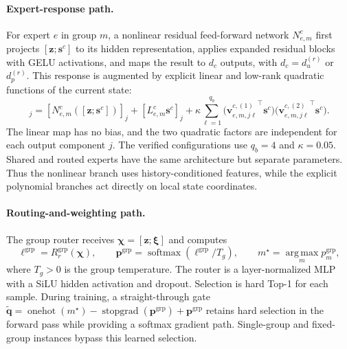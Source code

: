 \paragraph{Expert-response path.}
For expert $e$ in group $m$, a nonlinear residual feed-forward
network $N_{e,m}^c$ first projects $[\bm z;\bm s^c]$ to its hidden
representation, applies expanded residual blocks with GELU
activations, and maps the result to $d_c$ outputs, with
$d_c=d_u^{(r)}$ or $d_p^{(r)}$.
This response is augmented by explicit linear and low-rank quadratic
functions of the current state:
\begin{equation}
  [E_{e,m}^c(\bm z,\bm s^c)]_j
  =[N_{e,m}^c([\bm z;\bm s^c])]_j
   +[L_{e,m}^c\bm s^c]_j
   +\kappa\sum_{\ell=1}^{q_b}
    \bigl({\bm v_{e,m,j\ell}^{c,(1)}}^\top\bm s^c\bigr)
    \bigl({\bm v_{e,m,j\ell}^{c,(2)}}^\top\bm s^c\bigr).
  \label{eq:main_structured_expert}
\end{equation}
The linear map has no bias, and the two quadratic factors are
independent for each output component $j$. The verified configurations
use $q_b=4$ and $\kappa=0.05$. Shared and routed experts have the same
architecture but separate parameters. Thus the nonlinear branch
uses history-conditioned features, while the explicit polynomial
branches act directly on local state coordinates.

\paragraph{Routing-and-weighting path.}
The group router receives $\bm\chi=[\bm z;\bm\xi]$ and computes
\begin{equation}
  \bm\ell^{\mathrm{grp}}=R_r^{\mathrm{grp}}(\bm\chi),
  \qquad
  \bm p^{\mathrm{grp}}
   =\operatorname{softmax}(\bm\ell^{\mathrm{grp}}/T_g),
  \qquad
  m^\star=\operatorname*{arg\,max}_m p_m^{\mathrm{grp}},
  \label{eq:main_group_selection}
\end{equation}
where $T_g>0$ is the group temperature. The router is a
layer-normalized MLP with a SiLU hidden activation and dropout.
Selection is hard Top-1 for each sample. During training, a
straight-through gate
$\widetilde{\bm q}=\operatorname{onehot}(m^\star)
-\operatorname{stopgrad}(\bm p^{\mathrm{grp}})
+\bm p^{\mathrm{grp}}$
retains hard selection in the forward pass while providing a
softmax gradient path. Single-group and fixed-group instances bypass
this learned selection.

